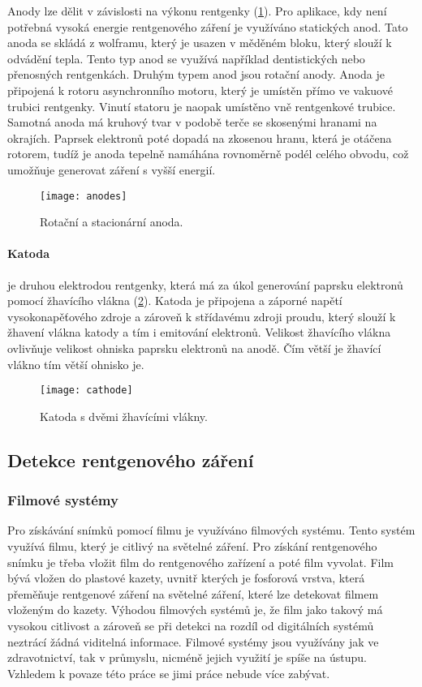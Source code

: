 Anody lze dělit v závislosti na výkonu rentgenky (\cref{fig:anodes}). Pro aplikace, kdy není potřebná vysoká energie rentgenového záření je využíváno statických anod. Tato anoda se skládá z wolframu, který je usazen v měděném bloku, který slouží k odvádění tepla. Tento typ anod se využívá například dentistických nebo přenosných rentgenkách. Druhým typem anod jsou rotační anody. Anoda je připojená k rotoru asynchronního motoru, který je umístěn přímo ve vakuové trubici rentgenky. Vinutí statoru je naopak umístěno vně rentgenkové trubice. Samotná anoda má kruhový tvar v podobě terče se skosenými hranami na okrajích. Paprsek elektronů poté dopadá na zkosenou hranu, která je otáčena rotorem, tudíž je anoda tepelně namáhána rovnoměrně podél celého obvodu, což umožňuje generovat záření s vyšší energií. \cite[str.~98]{Diagnostic-Radiology-Physics}

\begin{figure}[hb]
\centering
\texttt{[image: anodes]}
\caption{Rotační a stacionární anoda. \cite{the-xray-beam}}
\label{fig:anodes}
\end{figure}


\paragraph{Katoda}
je druhou elektrodou rentgenky, která má za úkol generování paprsku elektronů pomocí žhavícího vlákna (\cref{fig:cathode}). Katoda je připojena a záporné napětí vysokonapěťového zdroje a zároveň k střídavému zdroji proudu, který slouží k žhavení vlákna katody a tím i emitování elektronů.\cite[str.~93]{Diagnostic-Radiology-Physics} Velikost žhavícího vlákna ovlivňuje velikost ohniska paprsku elektronů na anodě. Čím větší je žhavící vlákno tím větší ohnisko je.

\begin{figure}[hb]
\centering
\texttt{[image: cathode]}
\caption{Katoda s dvěmi žhavícími vlákny. \cite{the-xray-beam}}
\label{fig:cathode}
\end{figure}

\subsection{Detekce rentgenového záření}
\subsubsection{Filmové systémy}
Pro získávání snímků pomocí filmu je využíváno filmových systému. Tento systém využívá filmu, který je citlivý na světelné záření. Pro získání rentgenového snímku je třeba vložit film do rentgenového zařízení a poté film vyvolat. Film bývá vložen do plastové kazety, uvnitř kterých je fosforová vrstva, která přeměňuje rentgenové záření na světelné záření, které lze detekovat filmem vloženým do kazety. Výhodou filmových systémů je, že film jako takový má vysokou citlivost a zároveň se při detekci na rozdíl od digitálních systémů neztrácí žádná viditelná informace. \cite[str.~155]{Diagnostic-Radiology-Physics} Filmové systémy jsou využívány jak ve zdravotnictví, tak v průmyslu, nicméně jejich využití je spíše na ústupu. Vzhledem k povaze této práce se jimi práce nebude více zabývat.

